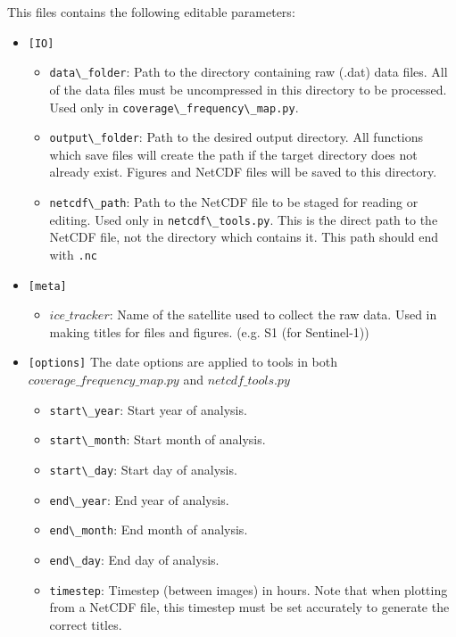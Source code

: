\documentclass{article}
\begin{document}
            This files contains the following editable parameters:
            \begin{itemize}
                \item{} \verb?[IO]?
                \begin{itemize}
                    \item \verb?data\_folder?: Path to the directory containing raw (.dat) data files. All of the data files must be uncompressed in this directory to be processed. Used only in \verb?coverage\_frequency\_map.py?.
                    \item \verb?output\_folder?: Path to the desired output directory. All functions which save files will create the path if the target directory does not already exist. Figures and NetCDF files will be saved to this directory.
                    \item \verb?netcdf\_path?: Path to the NetCDF file to be staged for reading or editing. Used only in \verb?netcdf\_tools.py?. This is the direct path to the NetCDF file, not the directory which contains it. This path should end with \verb?.nc?
                \end{itemize}
                \item{} \verb?[meta]?
                \begin{itemize}
                    \item $ice\_tracker$: Name of the satellite used to collect the raw data. Used in making titles for files and figures. (e.g. S1 (for Sentinel-1))
                \end{itemize}
                \item{} \verb?[options]?
                The date options are applied to tools in both $coverage\_frequency\_map.py$ and $netcdf\_tools.py$
                \begin{itemize}
                    \item \verb?start\_year?: Start year of analysis.
                    \item \verb?start\_month?: Start month of analysis.
                    \item \verb?start\_day?: Start day of analysis.
                    \item \verb?end\_year?: End year of analysis.
                    \item \verb?end\_month?: End month of analysis.
                    \item \verb?end\_day?: End day of analysis.
                    \item \verb?timestep?: Timestep (between images) in hours. Note that when plotting from a NetCDF file, this timestep must be set accurately to generate the correct titles.

\end{itemize}
\end{itemize}
\end{document}
